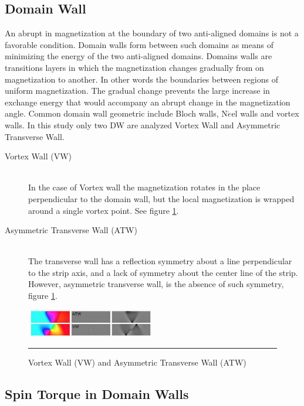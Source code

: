 \subsection{Domain Wall}

An abrupt in magnetization at the boundary of two anti-aligned domains is not a favorable condition. Domain walls form between such domains as means of minimizing the energy of the two anti-aligned domains. Domains walls are transitions layers in which the magnetization changes gradually from on magnetization to another. In other words the boundaries between regions of uniform magnetization. The gradual change prevents the large increase in exchange energy that would accompany an abrupt change in the magnetization angle. Common domain wall geometric include Bloch walls, N$\acute{e}$el walls and vortex walls\cite{spindomain}. In this study only two DW are analyzed Vortex Wall and Asymmetric Transverse Wall.

\begin{description}
  \item[Vortex Wall (VW)] \hfill \\
   In the case of Vortex wall the magnetization rotates in the place perpendicular to the domain wall, but the local magnetization is wrapped around a single vortex point. See figure \ref{fig:dw}.
   
 \item[Asymmetric Transverse Wall (ATW)] \hfill \\
 The transverse wall has a reflection symmetry about a line perpendicular to the strip axis, and a lack of symmetry about the center line of the strip. However, asymmetric transverse wall, is the absence of such symmetry, figure \ref{fig:dw}.
\end{description}

\begin{figure}[htbp]
	\centering
		\includegraphics[width=0.5\textwidth]{Figures/dw.png}
		\rule{35em}{0.5pt}
	\caption[Domain Wall VW, ATW]{Vortex Wall (VW) and Asymmetric Transverse Wall (ATW)}
	\label{fig:dw}
\end{figure}

\subsection{Spin Torque in Domain Walls}

